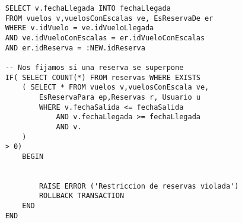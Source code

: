 \begin{itemize}
\begin{itemize}
\begin{lstlisting}
	SELECT v.fechaLlegada INTO fechaLlegada
	FROM vuelos v,vuelosConEscalas ve, EsReservaDe er
	WHERE v.idVuelo = ve.idVueloLlegada
	AND ve.idVueloConEscalas = er.idVueloConEscalas
	AND er.idReserva = :NEW.idReserva
				
	-- Nos fijamos si una reserva se superpone
	IF( SELECT COUNT(*) FROM reservas WHERE EXISTS
		( SELECT * FROM vuelos v,vuelosConEscala ve,
			EsReservaPara ep,Reservas r, Usuario u
			WHERE v.fechaSalida <= fechaSalida
				AND v.fechaLlegada >= fechaLlegada
				AND v.
		)
	> 0)
		BEGIN
						

			RAISE ERROR ('Restriccion de reservas violada')
			ROLLBACK TRANSACTION
		END
	END
	\end{lstlisting}
	
			\end{itemize}
\end{itemize}

